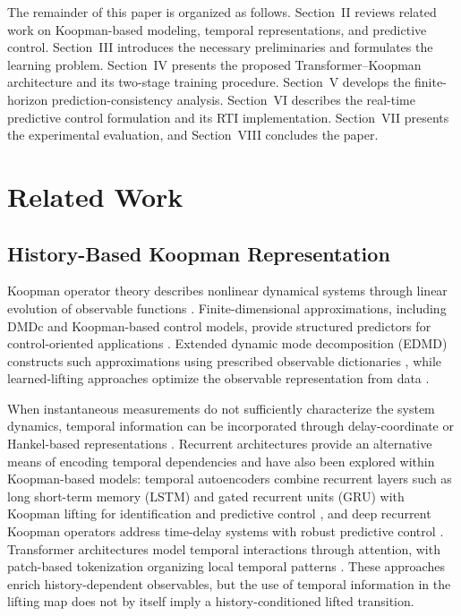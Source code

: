 \documentclass[journal]{IEEEtran}
\begin{document}
The remainder of this paper is organized as follows. Section~II reviews related work on Koopman-based modeling, temporal representations, and predictive control. Section~III introduces the necessary preliminaries and formulates the learning problem. Section~IV presents the proposed Transformer--Koopman architecture and its two-stage training procedure. Section~V develops the finite-horizon prediction-consistency analysis. Section~VI describes the real-time predictive control formulation and its RTI implementation. Section~VII presents the experimental evaluation, and Section~VIII concludes the paper.
\section{Related Work}
\label{sec:related_work}

\subsection{History-Based Koopman Representation}

Koopman operator theory describes nonlinear dynamical systems through linear evolution of observable functions \cite{koopman1931hamiltonian, koopman1932spectra, mezic2005spectral}. Finite-dimensional approximations, including DMDc and Koopman-based control models, provide structured predictors for control-oriented applications \cite{proctor2016dmdc, proctor2018generalizing, brunton2016invariant, korda2018linear}. Extended dynamic mode decomposition (EDMD) constructs such approximations using prescribed observable dictionaries \cite{williams2015data, williams2015kernel, klus2018data}, while learned-lifting approaches optimize the observable representation from data \cite{takeishi2017koopman, lusch2018deep, yeung2019learning, morton2019deep}.

When instantaneous measurements do not sufficiently characterize the system dynamics, temporal information can be incorporated through delay-coordinate or Hankel-based representations \cite{kamb2020timedelay, brunton2017chaos, arbabi2017ergodic, das2019delay}. Recurrent architectures provide an alternative means of encoding temporal dependencies and have also been explored within Koopman-based models: temporal autoencoders combine recurrent layers such as long short-term memory (LSTM) and gated recurrent units (GRU) with Koopman lifting for identification and predictive control \cite{shenoy2025temporal}, and deep recurrent Koopman operators address time-delay systems with robust predictive control \cite{han2024robust}. Transformer architectures model temporal interactions through attention, with patch-based tokenization organizing local temporal patterns \cite{vaswani2017attention, nie2023time}. These approaches enrich history-dependent observables, but the use of temporal information in the lifting map does not by itself imply a history-conditioned lifted transition.
\end{document}
